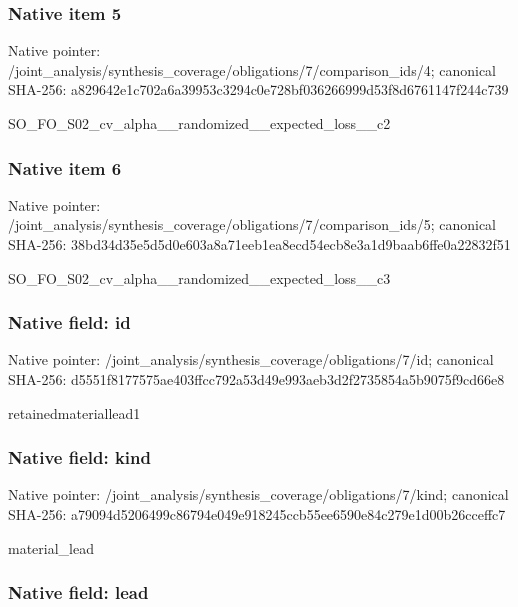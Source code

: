 \documentclass[10pt,a4paper]{article}
\begin{document}
\subsubsection{Native item 5}


Native pointer: /joint\_analysis/synthesi\allowbreak{}s\_coverage/obligations/7\allowbreak{}/comparison\_ids/4; canonical SHA-256: a829642e1c702a6a39953c32\allowbreak{}94c0e728bf036266999d53f8\allowbreak{}d6761147f244c739


SO\_FO\_S02\_cv\_alpha\_\_rand\allowbreak{}omized\_\_expected\_loss\_\_c\allowbreak{}2


\subsubsection{Native item 6}


Native pointer: /joint\_analysis/synthesi\allowbreak{}s\_coverage/obligations/7\allowbreak{}/comparison\_ids/5; canonical SHA-256: 38bd34d35e5d5d0e603a8a71\allowbreak{}eeb1ea8ecd54ecb8e3a1d9ba\allowbreak{}ab6ffe0a22832f51


SO\_FO\_S02\_cv\_alpha\_\_rand\allowbreak{}omized\_\_expected\_loss\_\_c\allowbreak{}3


\subsubsection{Native field: id}


Native pointer: /joint\_analysis/synthesi\allowbreak{}s\_coverage/obligations/7\allowbreak{}/id; canonical SHA-256: d5551f8177575ae403ffcc79\allowbreak{}2a53d49e993aeb3d2f273585\allowbreak{}4a5b9075f9cd66e8


retainedmateriallead1


\subsubsection{Native field: kind}


Native pointer: /joint\_analysis/synthesi\allowbreak{}s\_coverage/obligations/7\allowbreak{}/kind; canonical SHA-256: a79094d5206499c86794e049\allowbreak{}e918245ccb55ee6590e84c27\allowbreak{}9e1d00b26cceffc7


material\_lead


\subsubsection{Native field: lead}
\end{document}
